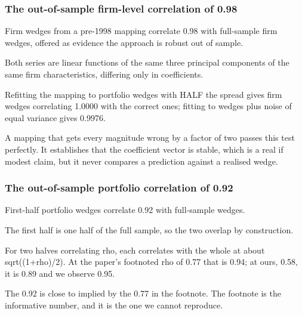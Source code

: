 \documentclass[11pt]{article}
\begin{document}
\subsubsection*{The out-of-sample firm-level correlation of 0.98}
\begin{description}[leftmargin=2.4cm,labelwidth=2.2cm,font=\normalfont\bfseries,style=sameline]
\item[Documented:] Firm wedges from a pre-1998 mapping correlate 0.98 with full-sample firm wedges, offered as evidence the approach is robust out of sample.
\item[Implemented:] Both series are linear functions of the same three principal components of the same firm characteristics, differing only in coefficients.
\item[Evidence:] Refitting the mapping to portfolio wedges with HALF the spread gives firm wedges correlating 1.0000 with the correct ones; fitting to wedges plus noise of equal variance gives 0.9976.
\item[Why it matters:] A mapping that gets every magnitude wrong by a factor of two passes this test perfectly. It establishes that the coefficient vector is stable, which is a real if modest claim, but it never compares a prediction against a realised wedge.
\end{description}
\subsubsection*{The out-of-sample portfolio correlation of 0.92}
\begin{description}[leftmargin=2.4cm,labelwidth=2.2cm,font=\normalfont\bfseries,style=sameline]
\item[Documented:] First-half portfolio wedges correlate 0.92 with full-sample wedges.
\item[Implemented:] The first half is one half of the full sample, so the two overlap by construction.
\item[Evidence:] For two halves correlating rho, each correlates with the whole at about sqrt((1+rho)/2). At the paper's footnoted rho of 0.77 that is 0.94; at ours, 0.58, it is 0.89 and we observe 0.95.
\item[Why it matters:] The 0.92 is close to implied by the 0.77 in the footnote. The footnote is the informative number, and it is the one we cannot reproduce.
\end{description}
\end{document}
